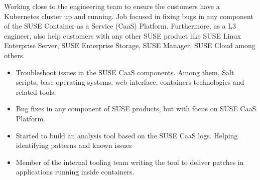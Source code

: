 \documentclass[10pt,a4paper]{altacv}
\begin{document}

\begin{fullwidth}
\makecvheader
\end{fullwidth}



Working close to the engineering team to ensure the customers have a Kubernetes cluster up and running. Job focused in fixing bugs in any component of the SUSE Container as a Service (CaaS) Platform. Furthermore, as a L3 engineer, also help customers with any other SUSE product like SUSE Linux Enterprise Server, SUSE Enterprise Storage, SUSE Manager, SUSE Cloud among others.
\begin{itemize}
\item Troubleshoot issues in the SUSE CaaS components. Among them, Salt scripts, base operating systems, web interface, containers technologies and related tools.
\item Bug fixes in any component of SUSE products, but with focus on SUSE CaaS Platform.
\item Started to build an analysis tool based on the SUSE CaaS logs. Helping identifying patterns and known issues
\item Member of the internal tooling team writing the tool to deliver patches in applications running inside containers. 
\end{itemize}

\divider
\end{document}
